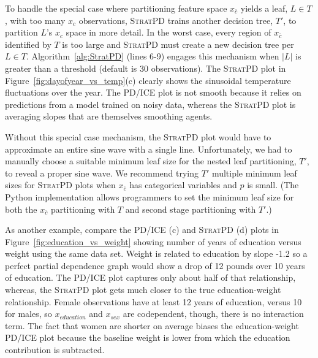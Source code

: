 \documentclass[12pt]{article}
\newcommand{\figref}[1]{Figure~\ref{#1}}
\newcommand{\algref}[1]{Algorithm~\ref{#1}}
\newcommand{\spd}{\fontfamily{cmr}\textsc{\small StratPD}}
\newcommand{\xnc}{$x_{\overline{c}}$}
\begin{document}
To handle the special case where partitioning feature space \xnc{} yields a leaf, $L \in T$, with too many $x_c$ observations, \spd{} trains another decision tree, $T'$, to partition $L$'s $x_c$ space in more detail. In the worst case, every region of \xnc{} identified by $T$ is too large and \spd{} must create a new decision tree per $L \in T$. \algref{alg:StratPD} (lines 6-9) engages this mechanism when $|L|$ is greater than a threshold (default is 30 observations). The \spd{} plot in \figref{fig:dayofyear_vs_temp}(c) clearly shows the sinusoidal temperature fluctuations over the year. The PD/ICE plot is not smooth because it relies on predictions from a model trained on noisy data, whereas the \spd{} plot is averaging slopes that are themselves smoothing agents.

Without this special case mechanism, the \spd{} plot would have to approximate an entire sine wave with a single line.  Unfortunately, we had to manually choose a suitable minimum leaf size for the nested leaf partitioning, $T'$, to reveal a proper sine wave.  We recommend trying $T'$ multiple minimum leaf sizes for \spd{} plots when \xnc{} has categorical variables and $p$ is small. (The Python implementation allows programmers to set the minimum leaf size for both the \xnc{} partitioning with $T$ and second stage partitioning with $T'$.)


As another example, compare the PD/ICE (c) and \spd{} (d) plots in \figref{fig:education_vs_weight} showing number of years of education versus weight using the same data set. Weight is related to education by slope -1.2 so a perfect partial dependence graph would show a drop of 12 pounds over 10 years of education.   The PD/ICE plot captures only about half of that relationship, whereas, the \spd{} plot gets much closer to the true education-weight relationship. Female observations have at least 12 years of education, versus 10 for males, so $x_{education}$ and $x_{sex}$ are codependent, though, there is no interaction term. The fact that women are shorter on average biases the education-weight PD/ICE plot because the baseline weight is lower from which the education contribution is  subtracted.
\end{document}
